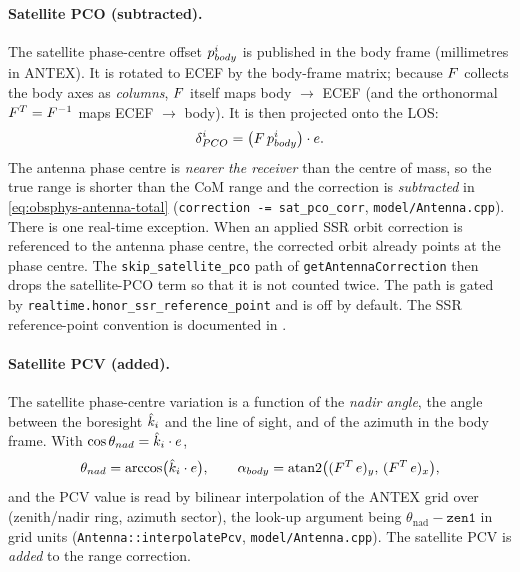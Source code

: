 \documentclass[main.tex]{subfiles}
\begin{document}
\paragraph{Satellite PCO (subtracted).}
The satellite phase-centre offset $p^i_{body}$ is published
in the body frame (millimetres in ANTEX).  It is rotated to ECEF by the
body-frame matrix; because $F$ collects the body axes as
\emph{columns}, $F$ itself maps body $\to$ ECEF (and the orthonormal
$F^{T}=F^{-1}$ maps ECEF $\to$ body).  It is then projected onto the
LOS:
\begin{equation}
\delta_{PCO}^{i}
=
\big(F\,p^i_{body}\big)\cdot e .
\label{eq:obsphys-sat-pco}
\end{equation}
The antenna phase centre is \emph{nearer the receiver} than the centre
of mass, so the true range is shorter than the CoM range and the
correction is \emph{subtracted} in \eqref{eq:obsphys-antenna-total}
(\texttt{correction -= sat\_pco\_corr}, \texttt{model/Antenna.cpp}).
There is one real-time exception.  When an applied SSR orbit correction
is referenced to the antenna phase centre, the corrected orbit already
points at the phase centre.  The \texttt{skip\_satellite\_pco} path of
\texttt{getAntennaCorrection} then drops the satellite-PCO term so that
it is not counted twice.  The path is gated by
\texttt{realtime.honor\_ssr\_reference\_point} and is off by default.
The SSR reference-point convention is documented in
.

\paragraph{Satellite PCV (added).}
The satellite phase-centre variation is a function of the \emph{nadir
angle}, the angle between the boresight $\hat{k}_i$ and the line of sight,
and of the azimuth in the body frame.  With $\cos\theta_{nad} =
\hat{k}_i\cdot e$,
\begin{equation}
\theta_{nad} = \arccos\!\big(\hat{k}_i\cdot e\big),
\qquad
\alpha_{body} = \operatorname{atan2}\!\big((F^{T}\,e)_y,\,
(F^{T}\,e)_x\big),
\label{eq:obsphys-nadir}
\end{equation}
and the PCV value is read by bilinear interpolation of the ANTEX grid
over (zenith/nadir ring, azimuth sector), the look-up argument being
$\theta_{\mathrm{nad}}-\mathtt{zen1}$ in grid units
(\texttt{Antenna::interpolatePcv}, \texttt{model/Antenna.cpp}).  The
satellite PCV is \emph{added} to the range correction.
\end{document}
